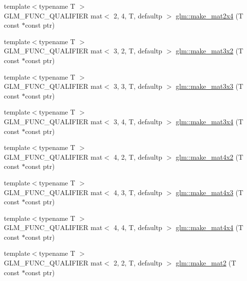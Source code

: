 \begin{DoxyCompactItemize}
\item 
{\footnotesize template$<$typename T $>$ }\\G\+L\+M\+\_\+\+F\+U\+N\+C\+\_\+\+Q\+U\+A\+L\+I\+F\+I\+ER mat$<$ 2, 4, T, defaultp $>$ \hyperlink{group__gtc__type__ptr_ga078b862c90b0e9a79ed43a58997d8388}{glm\+::make\+\_\+mat2x4} (T const $\ast$const ptr)
\item 
{\footnotesize template$<$typename T $>$ }\\G\+L\+M\+\_\+\+F\+U\+N\+C\+\_\+\+Q\+U\+A\+L\+I\+F\+I\+ER mat$<$ 3, 2, T, defaultp $>$ \hyperlink{group__gtc__type__ptr_ga27a24e121dc39e6857620e0f85b6e1a8}{glm\+::make\+\_\+mat3x2} (T const $\ast$const ptr)
\item 
{\footnotesize template$<$typename T $>$ }\\G\+L\+M\+\_\+\+F\+U\+N\+C\+\_\+\+Q\+U\+A\+L\+I\+F\+I\+ER mat$<$ 3, 3, T, defaultp $>$ \hyperlink{group__gtc__type__ptr_gaf2e8337b15c3362aaeb6e5849e1c0536}{glm\+::make\+\_\+mat3x3} (T const $\ast$const ptr)
\item 
{\footnotesize template$<$typename T $>$ }\\G\+L\+M\+\_\+\+F\+U\+N\+C\+\_\+\+Q\+U\+A\+L\+I\+F\+I\+ER mat$<$ 3, 4, T, defaultp $>$ \hyperlink{group__gtc__type__ptr_ga05dd66232aedb993e3b8e7b35eaf932b}{glm\+::make\+\_\+mat3x4} (T const $\ast$const ptr)
\item 
{\footnotesize template$<$typename T $>$ }\\G\+L\+M\+\_\+\+F\+U\+N\+C\+\_\+\+Q\+U\+A\+L\+I\+F\+I\+ER mat$<$ 4, 2, T, defaultp $>$ \hyperlink{group__gtc__type__ptr_ga8b34c9b25bf3310d8ff9c828c7e2d97c}{glm\+::make\+\_\+mat4x2} (T const $\ast$const ptr)
\item 
{\footnotesize template$<$typename T $>$ }\\G\+L\+M\+\_\+\+F\+U\+N\+C\+\_\+\+Q\+U\+A\+L\+I\+F\+I\+ER mat$<$ 4, 3, T, defaultp $>$ \hyperlink{group__gtc__type__ptr_ga0330bf6640092d7985fac92927bbd42b}{glm\+::make\+\_\+mat4x3} (T const $\ast$const ptr)
\item 
{\footnotesize template$<$typename T $>$ }\\G\+L\+M\+\_\+\+F\+U\+N\+C\+\_\+\+Q\+U\+A\+L\+I\+F\+I\+ER mat$<$ 4, 4, T, defaultp $>$ \hyperlink{group__gtc__type__ptr_ga8f084be30e404844bfbb4a551ac2728c}{glm\+::make\+\_\+mat4x4} (T const $\ast$const ptr)
\item 
{\footnotesize template$<$typename T $>$ }\\G\+L\+M\+\_\+\+F\+U\+N\+C\+\_\+\+Q\+U\+A\+L\+I\+F\+I\+ER mat$<$ 2, 2, T, defaultp $>$ \hyperlink{group__gtc__type__ptr_ga04409e74dc3da251d2501acf5b4b546c}{glm\+::make\+\_\+mat2} (T const $\ast$const ptr)

\end{DoxyCompactItemize}
